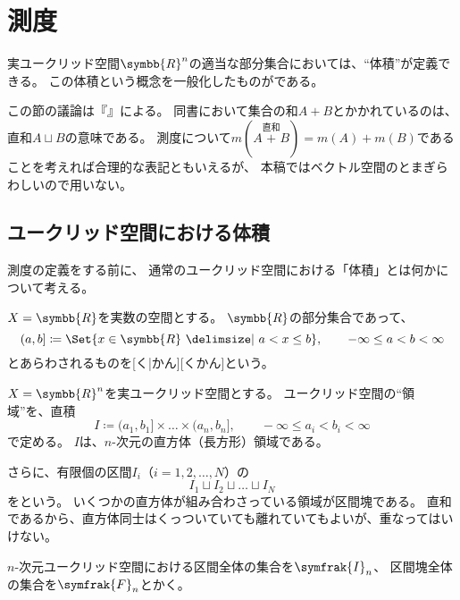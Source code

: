 \documentclass[../sotsu.tex]{subfiles}
\begin{document}
\section{測度}
\label{sec:measure}

実ユークリッド空間$\symbb{R}^n$の適当な部分集合においては、``体積''が定義できる。
この体積という概念を一般化したものがである。

この節の議論は\citeauthor{ito-lebesgue-1963}『』による。
同書において集合の和$A + B$とかかれているのは、直和$A \sqcup B$の意味である。
測度について$m(A \overset{直和}{+} B) = m(A) + m(B)$であることを考えれば合理的な表記ともいえるが、
本稿ではベクトル空間のとまぎらわしいので用いない。


\subsection{ユークリッド空間における体積}

測度の定義をする前に、
通常のユークリッド空間における「体積」とは何かについて考える。

$X = \symbb{R}$を実数の空間とする。
$\symbb{R}$の部分集合であって、
\begin{equation}
    \label{eq:interval-example}
    (a, b] \coloneq \Set{  x \in \symbb{R}  \given  a < x \leq b  },
    \qquad -\infty \leq a < b < \infty
\end{equation}
とあらわされるものを[く|かん][くかん]という\cite{ito-lebesgue-1963}。

$X = \symbb{R}^n$を実ユークリッド空間とする。
ユークリッド空間の``領域''を、直積
\begin{equation}
    I \coloneq (a_1, b_1] \times \dots \times (a_n, b_n],
    \qquad -\infty \leq a_i < b_i < \infty
\end{equation}
で定める。
$I$は、$n$-次元の直方体（長方形）領域である。

さらに、有限個の区間$I_i$（$i = 1, 2, \dots, N$）の
\begin{equation}
    I_1 \sqcup I_2 \sqcup \dots \sqcup I_N
\end{equation}
をという。
いくつかの直方体が組み合わさっている領域が区間塊である。
直和であるから、直方体同士はくっついていても離れていてもよいが、重なってはいけない。

$n$-次元ユークリッド空間における区間全体の集合を$\symfrak{I}_n$、
区間塊全体の集合を$\symfrak{F}_n$とかく\cite{ito-lebesgue-1963}。
\end{document}
